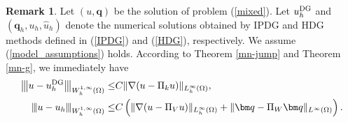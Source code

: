 \documentclass[1996/10/24]{amsart}
\theoremstyle{definition}
\newtheorem{remark}[theorem]{Remark}
\numberwithin{equation}{section}
\newcommand{\vertiii}[1]{{\left\vert\kern-0.25ex\left\vert\kern-0.25ex\left\vert #1
    \right\vert\kern-0.25ex\right\vert\kern-0.25ex\right\vert}}
\begin{document}
\begin{remark}
\label{remark_complete_discrete_W_1_infinity}
Let $(u,{\bm q})$ be the solution of problem (\ref{mixed}). Let $u_h^{{\rm DG}}$ and $({\bm q}_h,u_h,\widehat{u}_h)$ denote the
numerical solutions obtained by IPDG and HDG methods defined in (\ref{IPDG}) and (\ref{HDG}), respectively. We assume (\ref{model_assumptions})
holds. According to Theorem \ref{mn-jump} and Theorem \ref{mn-g}, we immediately have
\begin{align*}
\vertiii{u - u_{h}^{{\rm DG}}}_{W_{h}^{1,\infty}(\Omega)} \leq & C\|\nabla(u-\Pi_ku)\|_{L_h^{\infty}(\Omega)},\\
\vertiii{u - u_{h}}_{W_{h}^{1,\infty}(\Omega)} \leq & C\left(\|\nabla(u-\Pi_Vu)\|_{L_h^{\infty}(\Omega)}
+\|{\bm q}-\Pi_W{\bm q}\|_{L^{\infty}(\Omega)}\right).
\end{align*}
\end{remark}
\end{document}
